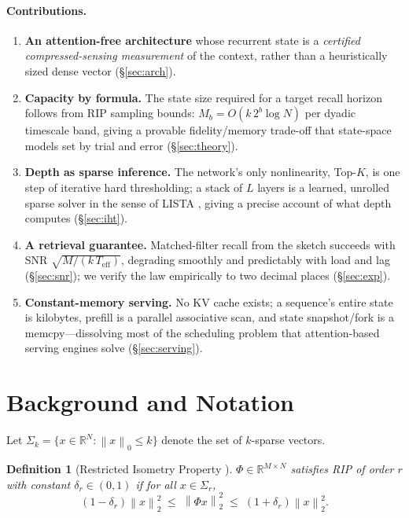 \documentclass[11pt]{article}
\newtheorem{definition}{Definition}
\newcommand{\R}{\mathbb{R}}
\newcommand{\norm}[1]{\left\lVert #1 \right\rVert}
\begin{document}
\paragraph{Contributions.}
\begin{enumerate}
  \item \textbf{An attention-free architecture} whose recurrent state is a \emph{certified compressed-sensing measurement} of the context, rather than a heuristically sized dense vector (\S\ref{sec:arch}).
  \item \textbf{Capacity by formula.} The state size required for a target recall horizon follows from RIP sampling bounds: $M_b = O(k\,2^b \log N)$ per dyadic timescale band, giving a provable fidelity/memory trade-off that state-space models set by trial and error (\S\ref{sec:theory}).
  \item \textbf{Depth as sparse inference.} The network's only nonlinearity, Top-$K$, is one step of iterative hard thresholding; a stack of $L$ layers is a learned, unrolled sparse solver in the sense of LISTA \citep{gregor2010learning}, giving a precise account of what depth computes (\S\ref{sec:iht}).
  \item \textbf{A retrieval guarantee.} Matched-filter recall from the sketch succeeds with SNR $\sqrt{M/(k\,T_{\mathrm{eff}})}$, degrading smoothly and predictably with load and lag (\S\ref{sec:snr}); we verify the law empirically to two decimal places (\S\ref{sec:exp}).
  \item \textbf{Constant-memory serving.} No KV cache exists; a sequence's entire state is kilobytes, prefill is a parallel associative scan, and state snapshot/fork is a memcpy---dissolving most of the scheduling problem that attention-based serving engines solve (\S\ref{sec:serving}).
\end{enumerate}

\section{Background and Notation}
\label{sec:background}

Let $\Sigma_k = \{x \in \R^N : \norm{x}_0 \le k\}$ denote the set of $k$-sparse vectors.

\begin{definition}[Restricted Isometry Property \citep{candes2005decoding}]
$\Phi \in \R^{M \times N}$ satisfies RIP of order $r$ with constant $\delta_r \in (0,1)$ if for all $x \in \Sigma_r$,
\begin{equation}
(1-\delta_r)\norm{x}_2^2 \;\le\; \norm{\Phi x}_2^2 \;\le\; (1+\delta_r)\norm{x}_2^2 .
\end{equation}
\end{definition}
\end{document}
